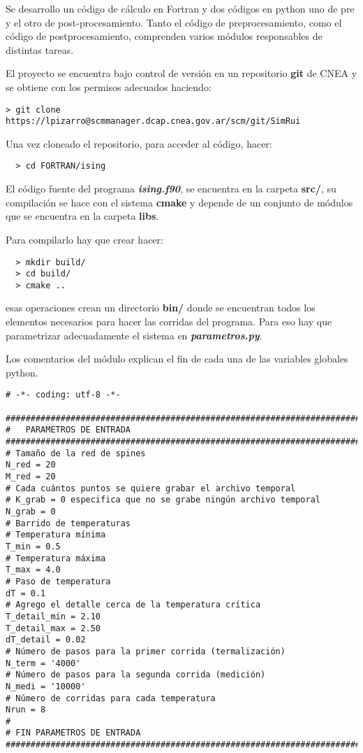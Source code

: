 Se desarrollo un c\'odigo de c\'alculo en Fortran y dos c\'odigos
en python uno  de pre y el otro de post-procesamiento. Tanto el código de preprocesamiento, 
como el código de postprocesamiento, comprenden varios módulos responsables de distintas
tareas.

El proyecto se encuentra bajo control de versión en un repositorio \textbf{git} de CNEA
y se obtiene con los permisos adecuados haciendo:

\begin{verbatim}
> git clone https://lpizarro@scmmanager.dcap.cnea.gov.ar/scm/git/SimRui
\end{verbatim}


Una vez cloneado el repositorio, para acceder al código, hacer:

\begin{verbatim}
  > cd FORTRAN/ising
\end{verbatim}



El c\'odigo fuente del programa \textbf{\textit{ising.f90}}, se encuentra en la carpeta
\textbf{src/}, su compilación se hace con el sistema \textbf{cmake} y depende
de un conjunto de módulos que se encuentra en la carpeta \textbf{libs}.

Para compilarlo hay que crear hacer:

\begin{verbatim}
  > mkdir build/
  > cd build/
  > cmake ..
\end{verbatim}

esas operaciones crean un directorio \textbf{bin/} donde se encuentran todos
los elementos necesarios para hacer las corridas del programa.
Para eso hay que parametrizar adecuadamente el sistema en \textbf{\textit{parametros.py}}.

Los comentarios del módulo explican el fin de cada una de las variables globales python.

\begin{verbatim}
# -*- coding: utf-8 -*-

###############################################################################       
#   PARAMETROS DE ENTRADA
###############################################################################
# Tamaño de la red de spines
N_red = 20
M_red = 20
# Cada cuántos puntos se quiere grabar el archivo temporal
# K_grab = 0 especifica que no se grabe ningún archivo temporal
N_grab = 0     
# Barrido de temperaturas
# Temperatura mínima
T_min = 0.5
# Temperatura máxima
T_max = 4.0
# Paso de temperatura
dT = 0.1
# Agrego el detalle cerca de la temperatura crítica
T_detail_min = 2.10
T_detail_max = 2.50
dT_detail = 0.02
# Número de pasos para la primer corrida (termalización)
N_term = '4000'
# Número de pasos para la segunda corrida (medición)
N_medi = '10000'
# Número de corridas para cada temperatura
Nrun = 8
#
# FIN PARAMETROS DE ENTRADA
###############################################################################

\end{verbatim}


